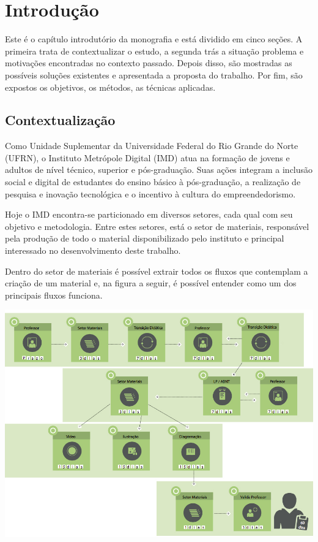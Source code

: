\chapter{Introdução}

Este é o capítulo introdutório da monografia e está dividido em cinco seções. A primeira trata de contextualizar o estudo, a segunda trás a situação problema e motivações encontradas no contexto passado. Depois disso, são mostradas as possíveis soluções existentes e apresentada a proposta do trabalho. Por fim, são expostos os objetivos, os métodos, as técnicas aplicadas.

\section{Contextualização}

Como Unidade Suplementar da Universidade Federal do Rio Grande do Norte (UFRN), o Instituto Metrópole Digital (IMD) atua na formação de jovens e adultos de nível técnico, superior e pós-graduação. Suas ações integram a inclusão social e digital de estudantes do ensino básico à pós-graduação, a realização de pesquisa e inovação tecnológica e o incentivo à cultura do empreendedorismo.

Hoje o IMD encontra-se particionado em diversos setores, cada qual com seu objetivo e metodologia. Entre estes setores, está o setor de materiais, responsável pela produção de todo o material disponibilizado pelo instituto e principal interessado no desenvolvimento deste trabalho. 

Dentro do setor de materiais é possível extrair todos os fluxos que contemplam a criação de um material e, na figura a seguir, é possível entender como um dos principais fluxos funciona. \\

\vspace{5mm}
\begin{minipage}[c]{\textwidth}
    \includegraphics[width=14cm]{Imagens/FluxoMateriaisNovos.jpg}
    \label{fig:fluxo_materiais_novos}
\end{minipage}
\vspace{5mm}

